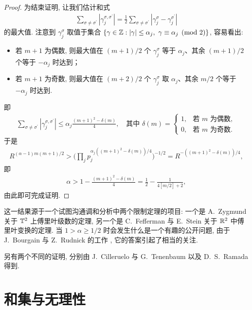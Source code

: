 \begin{proof}
为结束证明, 让我们估计和式
\begin{align*}
  \sum_{\sigma\neq\sigma^{\prime}}|\gamma_{j}^{\sigma,\sigma^{\prime}}|
  =\frac{1}{2}\sum_{\sigma\neq\sigma^{\prime}}|\gamma_{j}^{\sigma}-\gamma_{j}^{\sigma^{\prime}}|
\end{align*}
的最大值. 注意到 $\gamma_j^\sigma$ 取值于集合 $\{\gamma \in \mathbb{Z} : |\gamma| \leq \alpha_j,\ \gamma \equiv \alpha_j \pmod 2\}$, 容易看出:
\begin{itemize}
\item 若 $m + 1$ 为偶数, 则最大值在 $(m + 1)/2$ 个 $\gamma_j^\sigma$ 等于 $\alpha_j$、其余 $(m + 1)/2$ 个等于 $-\alpha_j$ 时达到；
\item 若 $m + 1$ 为奇数, 则最大值在 $(m + 2)/2$ 个 $\gamma_j^\sigma$ 取 $\alpha_j$、其余 $m/2$ 个等于 $-\alpha_j$ 时达到.
\end{itemize}
即
\begin{align*}
  \sum_{\sigma\neq\sigma^{\prime}}|\gamma_{j}^{\sigma,\sigma^{\prime}}|
  \leq\alpha_{j}\frac{(m+1)^{2}-\delta(m)}{4},\quad
  \text{其中 }\delta(m)=\begin{cases}
  1, & \text{若 } m \text{ 为偶数},\\
  0, & \text{若 } m \text{ 为奇数}.
  \end{cases}
\end{align*}
于是
\begin{align*}
  R^{(\alpha-1)m(m+1)/2}
  >\Big(\prod_{j}p_{j}^{\alpha_{j}((m+1)^{2}-\delta(m))/4}\Big)^{-1/2}
  =R^{-((m+1)^{2}-\delta(m))/4},
\end{align*}
即
\begin{align*}
  \alpha>1-\frac{(m+1)^{2}-\delta(m)}{4}=\frac{1}{2}-\frac{1}{4[m/2]+2},
\end{align*}
由此即可完成证明.
\end{proof}

这一结果源于一个试图沟通调和分析中两个限制定理的项目: 一个是 A.~Zygmund 关于 $\mathbb{T}^2$ 上傅里叶级数的定理, 另一个是 C.~Fefferman 与 E.~Stein 关于 $\mathbb{R}^2$ 中傅里叶变换的定理. 当 $1 > \alpha \geq 1/2$ 时会发生什么是一个有趣的公开问题, 由于 J.~Bourgain 与 Z.~Rudnick 的工作 \cite{b20}, 它的答案引起了相当的关注.

 另有两个不同的证明, 分别由 J.~Cilleruelo 与 G.~Tenenbaum \cite{b25} 以及 D.~S.~Ramada \cite{b37} 得到.

\section{和集与无理性}

